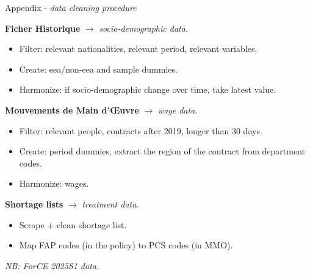 \documentclass[aspectratio=169,10pt,xcolor={dvipsnames}]{beamer}
\begin{document}
\begin{frame}{Appendix - \textit{data cleaning procedure}}
\label{datacleaning}

\textbf{\alert{Ficher Historique}} $\rightarrow$ \textit{socio-demographic data}.
\begin{itemize}
	\item Filter: relevant nationalities, relevant period, relevant variables.
	\item Create: eea/non-eea and sample dummies.
	\item Harmonize: if socio-demographic change over time, take latest value.
\end{itemize}
\vspace{0.4cm}
\textbf{\alert{Mouvements de Main d'Œuvre}} $\rightarrow$ \textit{wage data}.
\begin{itemize}
	\item Filter: relevant people, contracts after 2019, longer than 30 days.
	\item Create: period dummies, extract the region of the contract from department codes.
	\item Harmonize: wages. 
\end{itemize}
\vspace{0.2cm}
\textbf{\alert{Shortage lists}} $\rightarrow$ \textit{treatment data}.
\begin{itemize}
	\item Scrape + clean shortage list.
	\item Map FAP codes (in the policy) to PCS codes (in MMO).
\end{itemize}
\vspace{0.1cm}
\textit{NB: ForCE 2025S1 data.}

\hyperlink{sofar}{}
\end{frame}
\end{document}
